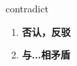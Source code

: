 
\begin{frame}
{\huge contradict}
\begin{center}
\begin{enumerate}\Large
  \item \textbf{否认，反驳}
  \item \textbf{与...相矛盾}
\end{enumerate}
\end{center}
\end{frame}
